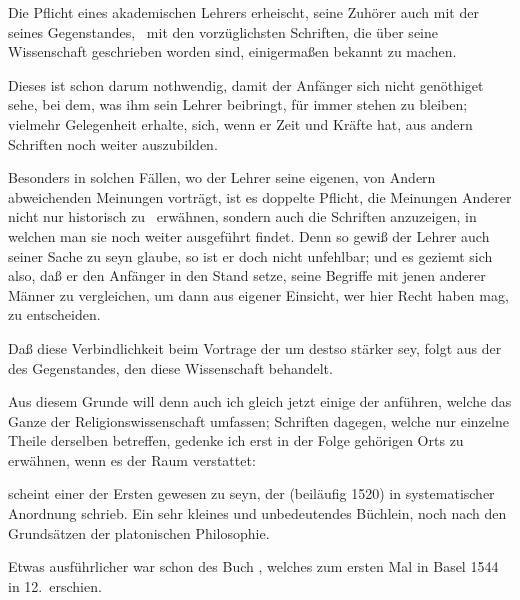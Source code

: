 \begin{aufza}
\item Die Pflicht eines akademischen Lehrers erheischt, seine Zuhörer auch mit der  seines Gegenstandes, \dh\ mit den vorzüglichsten Schriften, die über seine Wissenschaft geschrieben worden sind, einigermaßen bekannt zu machen.
\begin{aufzb}
\item Dieses ist  schon darum nothwendig, damit der Anfänger sich nicht genöthiget sehe, bei dem, was ihm sein Lehrer beibringt, für immer stehen zu bleiben; vielmehr Gelegenheit erhalte, sich, wenn er Zeit und Kräfte hat, aus andern Schriften noch weiter auszubilden.
\item Besonders in solchen Fällen, wo der Lehrer seine eigenen, von Andern abweichenden Meinungen vorträgt, ist es doppelte Pflicht, die Meinungen Anderer nicht nur historisch zu~ erwähnen, sondern auch die Schriften anzuzeigen, in welchen man sie noch weiter ausgeführt findet. Denn so gewiß der Lehrer auch seiner Sache zu seyn glaube, so ist er doch nicht unfehlbar; und es geziemt sich also, daß er den Anfänger in den Stand setze, seine Begriffe mit jenen anderer Männer zu vergleichen, um dann aus eigener Einsicht, wer hier Recht haben mag, zu entscheiden.
\item Daß diese Verbindlichkeit beim Vortrage der  um destso stärker sey, folgt aus der  des Gegenstandes, den diese Wissenschaft behandelt.
\end{aufzb}
\item Aus diesem Grunde will denn auch ich gleich jetzt einige der  anführen, welche das Ganze der Religionswissenschaft umfassen; Schriften dagegen, welche nur einzelne Theile derselben betreffen, gedenke ich erst in der Folge gehörigen Orts zu erwähnen, wenn es der Raum verstattet:
\begin{aufzb}
\item {} scheint einer der Ersten gewesen zu seyn, der  (beiläufig 1520) in systematischer Anordnung schrieb. Ein sehr kleines und unbedeutendes Büchlein, noch nach den Grundsätzen der platonischen Philosophie.
\item Etwas ausführlicher war schon des  Buch , welches zum ersten Mal in Basel 1544 in 12.\ erschien.

\end{aufzb}
\end{aufza}
